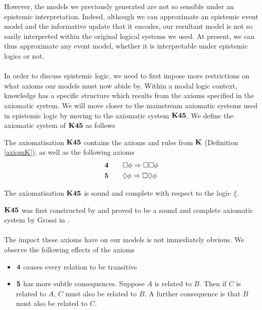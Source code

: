 However, the models we previously generated are not so sensible under an epistemic interpretation.
Indeed, although we can approximate an epistemic event model and the informative update that it
encodes, our resultant model is not so easily interpreted within the original logical systems we
used.
At present, we can thus approximate any event model, whether it is interpretable under epistemic
logics or not.\\
\\
In order to discuss epistemic logic, we need to first impose more restrictions on what axioms our
models must now abide by.
Within a modal logic context, knowledge has a specific structure which results from the axioms
specified in the axiomatic system.
We will move closer to the mainstream axiomatic systems used in epistemic logic by moving to the
axiomatic system $\bf K45$.
We define the axiomatic system of $\bf K45$ as follows

\begin{lemma} \label{axiomK45}
The axiomatisation $\bf K45$ contains the axioms and rules from $\bf K$ (Definition
    \ref{axiomK}), as well as the following axioms
\begin{alignat*}{2}
  & \bf 4 && \quad \Box \phi \Rightarrow \Box \Box \phi \\
  & \bf 5 && \quad \Diamond \phi \Rightarrow \Box \Diamond \phi
\end{alignat*}
\end{lemma}

\begin{lemma} \label{axiomK45SoundComplete}
The axiomatisation $\bf K45$ is sound and complete with respect to the logic
$\lang$.
\end{lemma}

$\bf K45$ was first constructed by \FIXME and proved to be a sound and complete axiomatic
system by Grossi in \cite{grossi2007designing}.\\
\\
The impact these axioms have on our models is not immediately obvious.
We observe the following effects of the axioms
\begin{itemize}
	\item $\bf 4$ causes every relation to be transitive
	\item $\bf 5$ has more subtle consequences.
    Suppose $A$ is related to $B$.
    Then if $C$ is related to $A$, $C$ must also be related to $B$.
    A further consequence is that $B$ must also be related to $C$.
\end{itemize}

